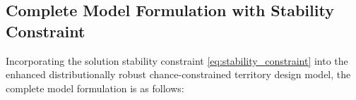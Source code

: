 \documentclass[preprint,12pt,authoryear]{elsarticle}
\begin{document}






\subsection{Complete Model Formulation with Stability Constraint}

Incorporating the solution stability constraint \eqref{eq:stability_constraint} into the enhanced distributionally robust chance-constrained territory design model, the complete model formulation is as follows:
\end{document}
